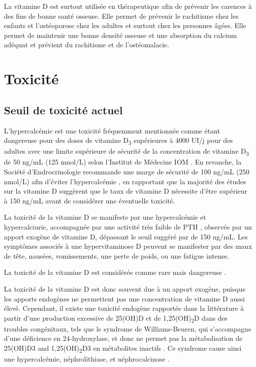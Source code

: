 \documentclass[
  a4paper,
  DIV=11,
  numbers=noendperiod,
  listof=totoc]{scrreprt}
\begin{document}
La vitamine D est surtout utilisée en thérapeutique afin de prévenir les
carences à des fins de bonne santé osseuse. Elle permet de prévenir le
rachitisme chez les enfants et l'ostéoporose chez les adultes et surtout
chez les personnes âgées. Elle permet de maintenir une bonne densité
osseuse et une absorption du calcium adéquat et prévient du rachitisme
et de l'ostéomalacie.

\hypertarget{toxicituxe9}{%
\section{Toxicité}\label{toxicituxe9}}

\hypertarget{seuil-de-toxicituxe9-actuel}{%
\subsection{Seuil de toxicité
actuel}\label{seuil-de-toxicituxe9-actuel}}

L'hypercalcémie est une toxicité fréquemment mentionnée comme étant
dangereuse pour des doses de vitamine D\textsubscript{3} supérieures à
4000 UI/j pour des adultes avec une limite supérieure de sécurité de la
concentration de vitamine D\textsubscript{3} de 50 ng/mL (125 nmol/L)
selon l'Institut de Médecine \acs{IOM} \autocite{IOM.2011,Holick.2011}.
En revanche, la Société d'Endrocrinologie recommande une marge de
sécurité de 100 ng/mL (250 nmol/L) afin d'éviter l'hypercalcémie
\autocite{Holick.2011}, en rapportant que la majorité des études sur la
vitamine D suggèrent que le taux de vitamine D nécessite d'être
supérieur à 150 ng/mL avant de considérer une éventuelle toxicité.

La toxicité de la vitamine D se manifeste par une hypercalcémie et
hypercalciurie, accompagnée par une activité très faible de PTH
\autocite{Marcinowska-Suchowierska.2018}, observée par un apport exogène
de vitamine D, dépassant le seuil suggéré par \textcite{Holick.2011} de
150 ng/mL. Les symptômes associés à une hypervitaminose D peuvent se
manifester par des maux de tête, nausées, vomissements, une perte de
poids, ou une fatigue intense.

La toxicité de la vitamine D est considérée comme rare mais dangereuse
\autocite{Marcinowska-Suchowierska.2018,Holick.2015}.

La toxicité de la vitamine D est donc souvent due à un apport exogène,
puisque les apports endogènes ne permettent pas une concentration de
vitamine D aussi élevé. Cependant, il existe une toxicité endogène
rapportée dans la littérature à partir d'une production excessive de
25(OH)D et de 1,25(OH)\textsubscript{2}D dans des troubles congénitaux,
tels que le syndrome de Williams-Beuren, qui s'accompagne d'une
déficience en 24-hydroxylase, et donc ne permet pas la métabolisation de
25(OH)D3 and 1,25(OH)\textsubscript{2}D3 en métabolites inactifs
\autocite{Marcinowska-Suchowierska.2018,Holick.2015}. Ce syndrome cause
ainsi une hypercalcémie, néphrolithiase, et néphrocalcinose
\autocite{Azer.2021}.
\end{document}
